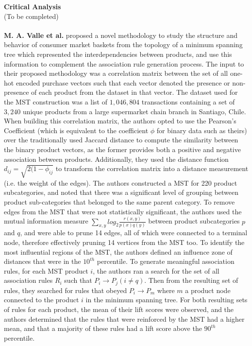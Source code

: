 \documentclass[a4paper,11pt]{article}
\begin{document}
\textbf{Critical Analysis}\\
(To be completed)
\\\\
\textbf{M. A. Valle et al.} \cite{mst_paper} proposed a novel methodology to study the structure and behavior of consumer market baskets from the topology of a minimum spanning tree which represented the interdependencies between products, and use this information to complement the association rule generation process. The input to their proposed methodology was a correlation matrix between the set of all one-hot encoded purchase vectors such that each vector denoted the presence or non-presence of each product from the dataset in that vector.  The dataset used for the MST construction was a list of $1,046,804$ transactions containing a set of $3,240$ unique products from a large supermarket chain branch in Santiago, Chile.  When building this correlation matrix, the authors opted to use the Pearson's Coefficient (which is equivalent to the coefficient $\phi$ for binary data such as theirs) over the traditionally used Jaccard distance to compute the similarity between the binary product vectors, as the former provides both a positive and negative association between products. Additionally,  they used the distance function $d_{ij} = \sqrt{2(1-\phi_{ij}}$ to transform the correlation matrix into a distance measurement (i.e. the weight of the edges).  The authors constructed a MST for 220 product subcategories, and noted that there was a significant level of grouping between product sub-categories that belonged to the same parent category.  To remove edges from the MST that were not statistically significant,  the authors used the mutual information \cite{measure} measure $\sum\limits_{x,y}log_2 \frac{r(x,y)}{p(x)q(y)}$ between product subcategories $p$ and $q$, and were able to prune 14 edges, all of which were connected to a terminal node, therefore effectively pruning 14 vertices from the MST too. To identify the most influential regions of the MST, the authors defined an influence zone of distances that were in the $10^{th}$ percentile. To generate meaningful association rules,  for each MST product $i$, the authors ran a search for the set of all association rules $R_i$ such that $P_i \rightarrow P_j (i \neq q)$. Then from the resulting set of rules, they searched for rules that obeyed $P_i \rightarrow P_m$ where $m$ a product node connected to the product $i$ in the minimum spanning tree.  For both resulting sets of rules for each product, the mean of their lift scores were observed, and the authors determined that the rules that were reinforced by the MST had a higher mean, and that a majority of these rules had a lift score above the $90^{th}$ percentile. 
\end{document}
